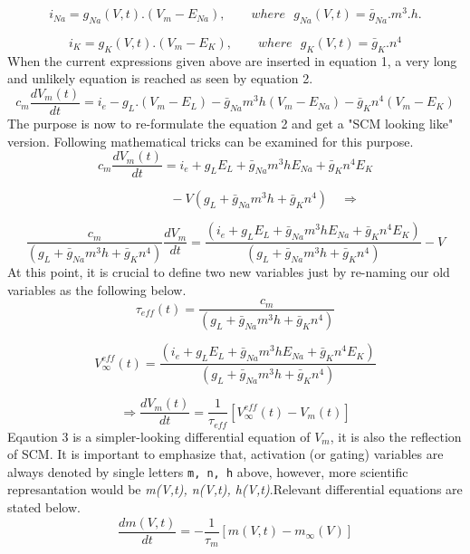 \documentclass{article}
\begin{document}
\begin{equation*}
i_{Na}=g_{Na}(V,t).(V_{m}-E_{Na}),\,\,\,\,\,\,\,\,\,\,\,\,where\,\,\,\,g_{Na}(V,t)=\bar{g}_{Na}.m^3.h.
\end{equation*}

\begin{equation*}
i_{K}=g_{K}(V,t).(V_{m}-E_{K}),\,\,\,\,\,\,\,\,\,\,\,\,where\,\,\,\,g_{K}(V,t)=\bar{g}_{K}.n^4
\end{equation*}
When the current expressions given above are inserted in equation 1, a very long and unlikely equation is reached as seen by equation 2. 
\begin{equation}
 c_{m}\frac{dV_{m}(t)}{dt}=i_{e}-g_{L}.(V_{m}-E_{L})-\bar{g}_{Na}m^{3}h(V_{m}-E_{Na})-\bar{g}_{K}n^4(V_{m}-E_{K})
\end{equation}
 The purpose is now to re-formulate the equation 2 and get a "SCM looking like" version. Following mathematical tricks can be examined for this purpose. 
\begin{equation*}
 c_{m}\frac{dV_{m}(t)}{dt}=i_{e}+g_{L}E_{L}+\bar{g}_{Na}m^{3}hE_{Na}+\bar{g}_{K}n^4E_{K}
\end{equation*}

\begin{equation*}
\,\,\,\,\,\,\,\,\,\,\,\,\,\,\,\,\,\,\,\,\,\,\,\,\,\,\,\,-V(g_{L}+\bar{g}_{Na}m^{3}h+\bar{g}_{K}n^4) \,\,\,\,\,\, \Longrightarrow
\end{equation*}

\begin{equation*}
 \frac{c_{m}}{(g_{L}+\bar{g}_{N
a}m^{3}h+\bar{g}_{K}n^4)}\frac{dV_{m}}{dt}=\frac{(i_{e}+g_{L}E_{L}+\bar{g}_{Na}m^{3}hE_{Na}+\bar{g}_{K}n^4E_{K})}{(g_{L}+\bar{g}_{Na}m^{3}h+\bar{g}_{K}n^4)}-V
\end{equation*}
At this point, it is crucial to define two new variables just by re-naming our old variables as the following below.
\begin{equation*}
 \tau_{eff}(t)=\frac{c_{m}}{(g_{L}+\bar{g}_{Na}m^{3}h+\bar{g}_{K}n^4)}
\end{equation*}

\begin{equation*}
 V_{\infty}^{eff}(t)=\frac{(i_{e}+g_{L}E_{L}+\bar{g}_{Na}m^{3}hE_{Na}+\bar{g}_{K}n^4E_{K})}{(g_{L}+\bar{g}_{Na}m^{3}h+\bar{g}_{K}n^4)}
\end{equation*}

\begin{equation}
 \Rightarrow\frac{dV_{m}(t)}{dt}=\frac{1}{\tau_{eff}}[V_{\infty}^{eff}(t)-V_{m}(t)]
\end{equation}
Eqaution 3 is a simpler-looking differential equation of $V_{m}$, it is also the reflection of SCM. It is important to emphasize that, activation (or gating) variables are always denoted by single letters \texttt{m, n, h} above, however, more scientific represantation would be \textit{m(V,t), n(V,t), h(V,t)}.Relevant differential equations are stated below.
\begin{equation}
 \frac{dm(V,t)}{dt}=-\frac{1}{\tau_{m}} [m(V,t)-m_{\infty}(V)]
\end{equation}
\end{document}
